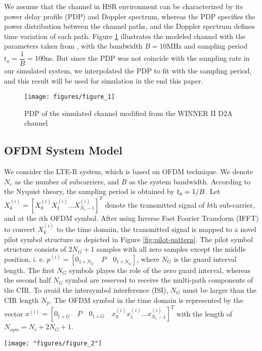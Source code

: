 \documentclass[AMA]{WileyNJD-v1}
\begin{document}
We assume that the channel in HSR environment can be characterized by its power delay profile (PDP) and Doppler spectrum, whereas the PDP specifies the power distribution between the channel paths, and the Doppler spectrum defines time variation of each path. Figure \ref{fig:rhod2achannel} illustrates the modeled channel  with the parameters taken from \cite{Guan2011}, with the bandwidth $B=10$MHz and sampling period $t_a=\dfrac{1}{B}=100$ns. But since the PDP was not coincide with the sampling rate in our simulated system, we interpolated the PDP to fit with the sampling period, and this result will be used for simulation in the end this paper.
%
\begin{figure}
		\centering
		\texttt{[image: figures/figure\_1]}
		\caption{PDP of the simulated channel modified from the WINNER II D2A channel}
		\label{fig:rhod2achannel}
\end{figure}
	
\subsection{OFDM System Model}\label{section-2.2}
	
We consider the LTE-R system, which is based on OFDM technique. We denote $N_{c}$ as the number of subcarriers, and $B$ as the system bandwidth. According to the Nyquist theory, the sampling period is obtained by $t_{\rm a}=1/B$. Let $X^{(i)}_{k}= [X^{(i)}_{0} X^{(i)}_{1} \dots  X^{(i)}_{N_c-1}]^{T}$ denote the transmitted signal of $k$th sub-carrier, and at the $i$th OFDM symbol. After using Inverse Fast Fourier Transform (IFFT) to convert $X^{(i)}_{k}$ to the time domain, the transmitted signal is mapped to a novel pilot symbol structure as depicted in Figure \ref{fig:pilot-pattern}. The pilot symbol structure consists of  $2N_G+1$ samples with all zero samples except the middle position, i. e. $p^{(i)}=[0_{1\times N_G}\quad P\quad  0_{1\times N_G}]$, where $N_G$ is the guard interval length. The first  $N_G$ symbols playes the role of the zero guard interval, whereas the second half $N_G$ symbol are reserved to receive the multi-path components of the CIR. To avoid the intersymbol interference (ISI), $N_G$ must be larger than the CIR length $N_p$. The OFDM symbol in the time domain is represented by the  vector $x^{(i)}=[0_{1\times G}\quad P\quad  0_{1\times G}\quad  x^{(i)}_{0} x^{(i)}_{1} \dots x^{(i)}_{N_c-1}]^{T}$ with the length of $ N_{sym}=N_c+2N_G+1$.
%
\begin{figure*}[t]
		\centering
		\texttt{[image: "figures/figure\_2"]}
		\caption{The novel pilot structure for channel estimation in HSR environment }
		\label{fig:pilot-pattern}
\end{figure*}
%	
	
\end{document}
